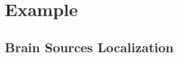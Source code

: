 \section{Example}\label{sec:example}

\subsection{Brain Sources Localization}\label{sec:BSL_example}
%